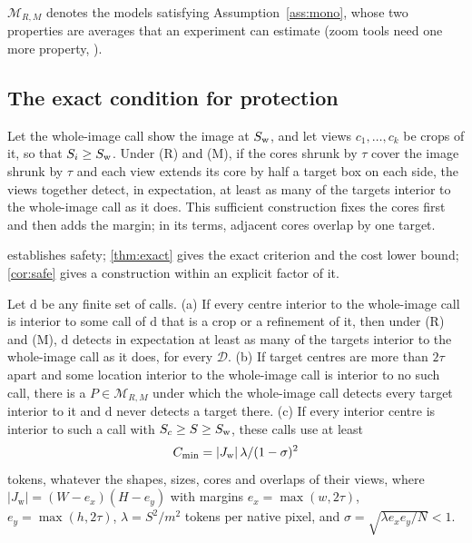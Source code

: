 $\mathcal{M}_{R,M}$ denotes the models satisfying Assumption~\ref{ass:mono}, whose two properties are averages that an experiment can estimate (zoom tools need one more property, ).

\subsection{The exact condition for protection}

\begin{theorem}
\label{thm:safe}
Let the whole-image call show the image at $S_{\mathrm{w}}$, and let views $c_1, \dots, c_k$ be crops of it, so that $S_i \ge S_{\mathrm{w}}$. Under (R) and (M), if the cores shrunk by $\tau$ cover the image shrunk by $\tau$ and each view extends its core by half a target box on each side, the views together detect, in expectation, at least as many of the targets interior to the whole-image call as it does. This sufficient construction fixes the cores first and then adds the margin; in its terms, adjacent cores overlap by one target.
\end{theorem}

 establishes safety; \cref{thm:exact} gives the exact criterion and the cost lower bound; \cref{cor:safe} gives a construction within an explicit factor of it.

\begin{theorem}
\label{thm:exact}
Let $\mathrm{d}$ be any finite set of calls. (a) If every centre interior to the whole-image call is interior to some call of $\mathrm{d}$ that is a crop or a refinement of it, then under (R) and (M), $\mathrm{d}$ detects in expectation at least as many of the targets interior to the whole-image call as it does, for every $\mathcal{D}$. (b) If target centres are more than $2\tau$ apart and some location interior to the whole-image call is interior to no such call, there is a $P \in \mathcal{M}_{R,M}$ under which the whole-image call detects every target interior to it and $\mathrm{d}$ never detects a target there. (c) If every interior centre is interior to such a call with $S_c \ge S \ge S_{\mathrm{w}}$, these calls use at least
\[
C_{\min} = |J_{\mathrm{w}}|\,\lambda/(1 - \sigma)^2
\]
tokens, whatever the shapes, sizes, cores and overlaps of their views, where $|J_{\mathrm{w}}| = (W - e_x)(H - e_y)$ with margins $e_x = \max(w, 2\tau)$, $e_y = \max(h, 2\tau)$, $\lambda = S^2/m^2$ tokens per native pixel, and $\sigma = \sqrt{\lambda e_x e_y / N} < 1$.
\end{theorem}

